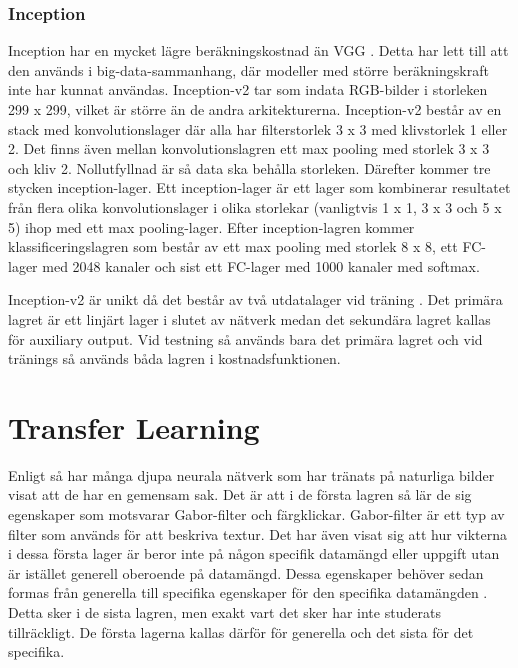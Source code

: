 \documentclass[]{kththesis}
\begin{document}
\subsubsection{Inception}
Inception har en mycket lägre beräkningskostnad än VGG \parencite{szegedy2016rethinking}. Detta har lett till att den används i big-data-sammanhang, där modeller med större beräkningskraft inte har kunnat användas. Inception-v2 tar som indata RGB-bilder i storleken 299 x 299, vilket är större än de andra arkitekturerna. Inception-v2 består av en stack med konvolutionslager där alla har filterstorlek 3 x 3 med klivstorlek 1 eller 2. Det finns även mellan konvolutionslagren ett max pooling med storlek 3 x 3 och kliv 2. Nollutfyllnad är så data ska behålla storleken. Därefter kommer tre stycken inception-lager. Ett inception-lager är ett lager som kombinerar resultatet från flera olika konvolutionslager i olika storlekar (vanligtvis 1 x 1, 3 x 3 och 5 x 5) ihop med ett max pooling-lager. Efter inception-lagren kommer klassificeringslagren som består av ett max pooling med storlek 8 x 8, ett FC-lager med 2048 kanaler och sist ett FC-lager med 1000 kanaler med softmax.

Inception-v2 är unikt då det består av två utdatalager vid träning \parencite{szegedy2016rethinking}. Det primära lagret är ett linjärt lager i slutet av nätverk medan det sekundära lagret kallas för auxiliary output. Vid testning så används bara det primära lagret och vid tränings så används båda lagren i kostnadsfunktionen.

\section{Transfer Learning}
Enligt \cite{yosinski2014transferable} så har många djupa neurala nätverk som har tränats på naturliga bilder visat att de har en gemensam sak. Det är att i de första lagren så lär de sig egenskaper som motsvarar Gabor-filter och färgklickar. Gabor-filter är ett typ av filter som används för att beskriva textur. Det har även visat sig att hur vikterna i dessa första lager är beror inte på någon specifik datamängd eller uppgift utan är istället generell oberoende på datamängd. Dessa egenskaper behöver sedan formas från generella till specifika egenskaper för den specifika datamängden \parencite{yosinski2014transferable}. Detta sker i de sista lagren, men exakt vart det sker har inte studerats tillräckligt. De första lagerna kallas därför för generella och det sista för det specifika.
\end{document}

